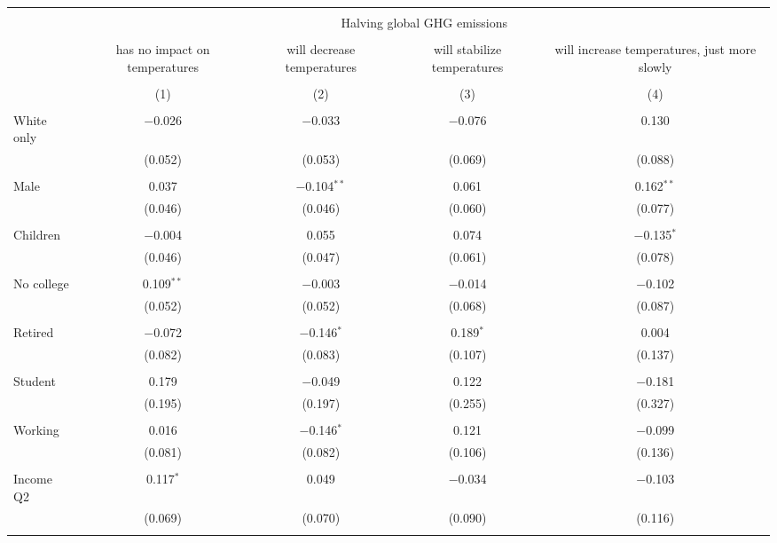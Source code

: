 
\begin{tabular}{@{\extracolsep{5pt}}lcccc} 
\\[-1.8ex]\hline 
\hline \\[-1.8ex] 
 & \multicolumn{4}{c}{Halving global GHG emissions} \\ 
\cline{2-5} 
\\[-1.8ex] & has no impact on temperatures & will decrease temperatures & will stabilize temperatures & will increase temperatures, just more slowly \\ 
\\[-1.8ex] & (1) & (2) & (3) & (4)\\ 
\hline \\[-1.8ex] 
 White only & $-$0.026 & $-$0.033 & $-$0.076 & 0.130 \\ 
  & (0.052) & (0.053) & (0.069) & (0.088) \\ 
  & & & & \\ 
 Male & 0.037 & $-$0.104$^{**}$ & 0.061 & 0.162$^{**}$ \\ 
  & (0.046) & (0.046) & (0.060) & (0.077) \\ 
  & & & & \\ 
 Children & $-$0.004 & 0.055 & 0.074 & $-$0.135$^{*}$ \\ 
  & (0.046) & (0.047) & (0.061) & (0.078) \\ 
  & & & & \\ 
 No college & 0.109$^{**}$ & $-$0.003 & $-$0.014 & $-$0.102 \\ 
  & (0.052) & (0.052) & (0.068) & (0.087) \\ 
  & & & & \\ 
 Retired & $-$0.072 & $-$0.146$^{*}$ & 0.189$^{*}$ & 0.004 \\ 
  & (0.082) & (0.083) & (0.107) & (0.137) \\ 
  & & & & \\ 
 Student & 0.179 & $-$0.049 & 0.122 & $-$0.181 \\ 
  & (0.195) & (0.197) & (0.255) & (0.327) \\ 
  & & & & \\ 
 Working & 0.016 & $-$0.146$^{*}$ & 0.121 & $-$0.099 \\ 
  & (0.081) & (0.082) & (0.106) & (0.136) \\ 
  & & & & \\ 
 Income Q2 & 0.117$^{*}$ & 0.049 & $-$0.034 & $-$0.103 \\ 
  & (0.069) & (0.070) & (0.090) & (0.116) \\ 
  & & & & \\ 

\end{tabular}
